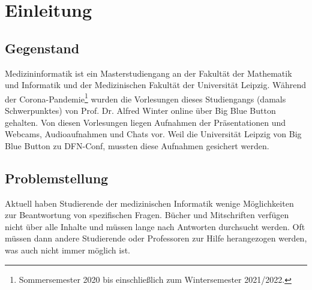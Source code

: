 \chapter{Einleitung}\label{ch:introduction}

\section{Gegenstand}

Medizininformatik ist ein Masterstudiengang an der Fakultät der Mathematik und Informatik und der Medizinischen Fakultät der Universität Leipzig.
Während der Corona-Pandemie\footnote{Sommersemester 2020 bis einschließlich zum Wintersemester 2021/2022.} wurden die Vorlesungen dieses Studiengangs (damals Schwerpunktes) von Prof. Dr. Alfred Winter online über Big Blue Button gehalten.
Von diesen Vorlesungen liegen Aufnahmen der Präsentationen und Webcams, Audioaufnahmen und Chats vor. Weil die Universität Leipzig von Big Blue Button zu DFN-Conf, mussten diese Aufnahmen gesichert werden.





\section{Problemstellung}



Aktuell haben Studierende der medizinischen Informatik wenige Möglichkeiten zur Beantwortung von spezifischen Fragen.
Bücher und Mitschriften verfügen nicht über alle Inhalte und müssen lange nach Antworten durchsucht werden.
Oft müssen dann andere Studierende oder Professoren zur Hilfe herangezogen werden, was auch nicht immer möglich ist.

